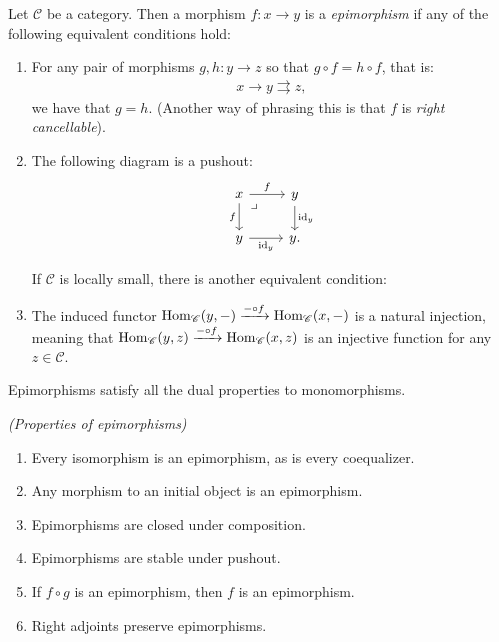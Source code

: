 \documentclass{article}[11pt]
\begin{document}
\begin{definition}\label{def:epimorphism} Let $\mathscr{C}$ be a category. Then a morphism $f: x \to y$ is a \textit{epimorphism} if any of the following equivalent conditions hold:
\begin{enumerate}
    \item For any pair of morphisms $g,h : y \to z$ so that $g\circ f = h\circ f$, that is:
    \begin{align*}
         x \to y \rightrightarrows z,
    \end{align*}
    we have that $g = h$. (Another way of phrasing this is that $f$ is \textit{right cancellable}).

    \item The following diagram is a pushout:
\[ \begin{tikzcd}
    x\rar["f" above]\dar["f" left]\pb & y\dar["\id_y" right]\\
    y\rar["\id_y" below] & y.
\end{tikzcd} \]

If $\mathscr{C}$ is locally small, there is another equivalent condition:
\end{enumerate}


\begin{enumerate}
\setcounter{enumi}{2}
    \item The induced functor $\textup{Hom}_\mathscr{C}(y,-) \xrightarrow{-\circ f} \textup{Hom}_\mathscr{C}(x,-)$ is a natural injection, meaning that $\textup{Hom}_\mathscr{C}(y,z) \xrightarrow{-\circ f} \textup{Hom}_\mathscr{C}(x,z)$ is an injective function for any $z\in \mathscr{C}$.
\end{enumerate}
\end{definition}

Epimorphisms satisfy all the dual properties to monomorphisms.

\begin{exercise}\label{exer:properties-of-epimorphisms} \textit{(Properties of epimorphisms)}
\begin{enumerate}
    \item Every isomorphism is an epimorphism, as is every coequalizer.
    \item Any morphism to an initial object is an epimorphism.
    \item Epimorphisms are closed under composition.
    \item Epimorphisms are stable under pushout.
    \item If $f\circ g$ is an epimorphism, then $f$ is an epimorphism.
    \item Right adjoints preserve epimorphisms.
\end{enumerate}
\end{exercise}
\end{document}
